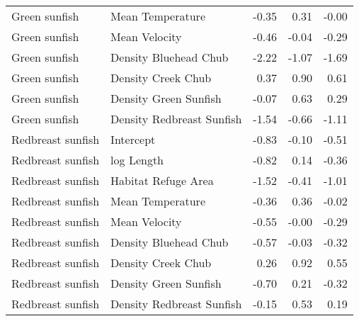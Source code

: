 \begin{table}[ht]
\begin{tabular}{llrrr}
  Green sunfish & Mean Temperature & -0.35 & 0.31 & -0.00 \\ 
  Green sunfish & Mean Velocity & -0.46 & -0.04 & -0.29 \\ 
  Green sunfish & Density Bluehead Chub & -2.22 & -1.07 & -1.69 \\ 
  Green sunfish & Density Creek Chub & 0.37 & 0.90 & 0.61 \\ 
  Green sunfish & Density Green Sunfish & -0.07 & 0.63 & 0.29 \\ 
  Green sunfish & Density Redbreast Sunfish & -1.54 & -0.66 & -1.11 \\ 
  Redbreast sunfish & Intercept & -0.83 & -0.10 & -0.51 \\ 
  Redbreast sunfish & log Length & -0.82 & 0.14 & -0.36 \\ 
  Redbreast sunfish & Habitat Refuge Area & -1.52 & -0.41 & -1.01 \\ 
  Redbreast sunfish & Mean Temperature & -0.36 & 0.36 & -0.02 \\ 
  Redbreast sunfish & Mean Velocity & -0.55 & -0.00 & -0.29 \\ 
  Redbreast sunfish & Density Bluehead Chub & -0.57 & -0.03 & -0.32 \\ 
  Redbreast sunfish & Density Creek Chub & 0.26 & 0.92 & 0.55 \\ 
  Redbreast sunfish & Density Green Sunfish & -0.70 & 0.21 & -0.32 \\ 
  Redbreast sunfish & Density Redbreast Sunfish & -0.15 & 0.53 & 0.19 \\ 
   \hline
\end{tabular}
\end{table}
